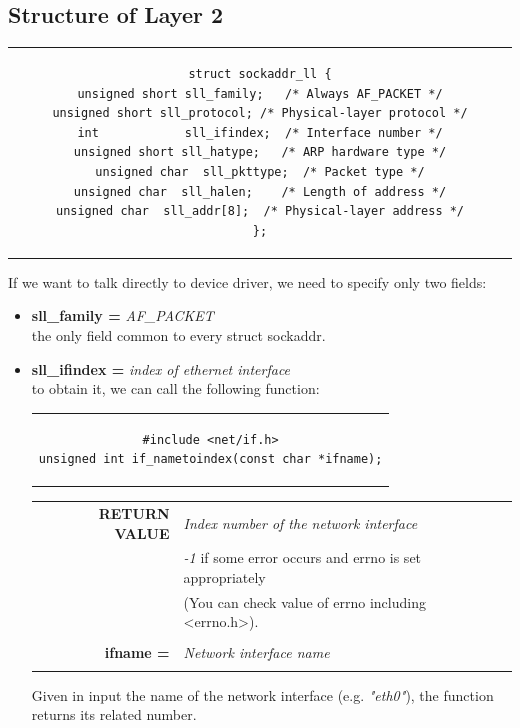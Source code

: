 \subsection{Structure of Layer 2}
\begin{center}
\begin{tabular}{c}
\begin{lstlisting}[linewidth=320pt, basicstyle=\footnotesize\sffamily,]
struct sockaddr_ll {                                                                unsigned short sll_family;   /* Always AF_PACKET */                             unsigned short sll_protocol; /* Physical-layer protocol */                      int            sll_ifindex;  /* Interface number */                             unsigned short sll_hatype;   /* ARP hardware type */                            unsigned char  sll_pkttype;  /* Packet type */                                  unsigned char  sll_halen;    /* Length of address */                            unsigned char  sll_addr[8];  /* Physical-layer address */                   };
\end{lstlisting}
\end{tabular}
\end{center}
If we want to talk directly to device driver, we need to specify only two fields:
\begin{itemize}
\item{\textbf{sll\_family =} \textit{AF\_PACKET}\\
the only field common to every struct sockaddr.
}
\item{\textbf{sll\_ifindex =} \textit{index of ethernet interface}\\
to obtain it, we can call the following function:
\begin{center}
\begin{tabular}{c}
\begin{lstlisting}[linewidth=260pt, basicstyle=\footnotesize\sffamily,]
#include <net/if.h>
unsigned int if_nametoindex(const char *ifname);
\end{lstlisting}
\end{tabular}
\end{center}
\begin{table}[H]
\centering\footnotesize
\begin{tabular}{rl}
\textbf{RETURN VALUE} & {\textit{Index number of the network interface}}\\
{} & {\textit{-1} if some error occurs and errno is set appropriately}\\
{} & {(You can check value of errno including <errno.h>).}\\
& \\
\textbf{ifname =} & {\textit{Network interface name}}\\
&\\
\end{tabular}
\end{table}
Given in input the name of the network interface (e.g. \textit{"eth0"}), the function returns its related number.
}
\end{itemize}

